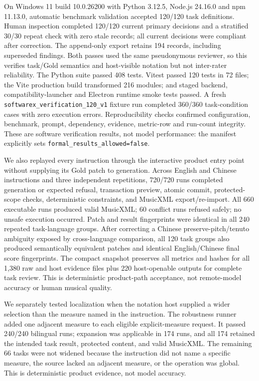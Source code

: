\documentclass[preprint,12pt,a4paper]{elsarticle}
\begin{document}
On Windows 11 build 10.0.26200 with Python 3.12.5, Node.js 24.16.0 and npm 11.13.0,
automatic benchmark validation accepted 120/120 task definitions. Human inspection
completed 120/120 current primary decisions and a stratified 30/30 repeat check with
zero stale records; all current decisions were compliant after correction. The
append-only export retains 194 records, including superseded findings. Both passes used
the same pseudonymous reviewer, so this verifies task/Gold semantics and host-visible
notation but not inter-rater reliability. The Python suite passed 408 tests.
Vitest passed 120 tests in 72 files; the Vite production build transformed 216 modules; and staged
backend, compatibility-launcher and Electron runtime smoke tests passed. A fresh
\texttt{softwarex\_verification\_120\_v1} fixture run completed 360/360 task-condition
cases with zero execution errors. Reproducibility checks confirmed configuration,
benchmark, prompt, dependency, evidence, metric-row and run-count integrity. These are
software verification results, not model performance: the manifest explicitly sets
\texttt{formal\_results\_allowed=false}.

We also replayed every instruction through the interactive product entry point without
supplying its Gold patch to generation. Across English and Chinese instructions and
three independent repetitions, 720/720 runs completed generation or expected refusal,
transaction preview, atomic commit, protected-scope checks, deterministic constraints,
and MusicXML export/re-import. All 660 executable runs produced valid MusicXML; 60
conflict runs refused safely; no unsafe execution occurred. Patch and result fingerprints
were identical in all 240 repeated task-language groups. After correcting a Chinese
preserve-pitch/tenuto ambiguity exposed by cross-language comparison, all 120 task groups
also produced semantically equivalent patches and identical English/Chinese final score
fingerprints. The compact snapshot preserves
all metrics and hashes for all 1,380 raw and host evidence files plus 220 host-openable
outputs for complete task review. This is
deterministic product-path acceptance, not remote-model accuracy or human musical quality.

We separately tested localization when the notation host supplied a wider selection
than the measure named in the instruction. The robustness runner added one adjacent
measure to each eligible explicit-measure request. It passed 240/240 bilingual runs;
expansion was applicable in 174 runs, and all 174 retained the intended task result,
protected content, and valid MusicXML. The remaining 66 tasks were not widened because
the instruction did not name a specific measure, the source lacked an adjacent measure,
or the operation was global. This is deterministic product evidence, not model accuracy.
\end{document}
